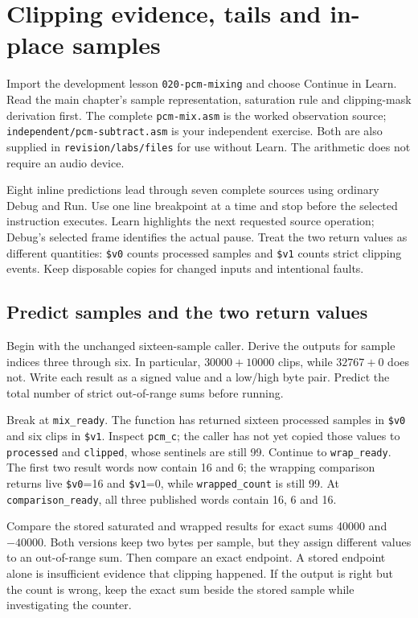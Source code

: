 \chapter{Clipping evidence, tails and in-place samples}
\label{revision-lab:pcm}

Import the development lesson \texttt{020-pcm-mixing} and choose Continue in
Learn. Read the main chapter's sample representation, saturation rule and
clipping-mask derivation first. The complete \texttt{pcm-mix.asm} is the worked
observation source; \texttt{independent/pcm-subtract.asm} is your independent
exercise. Both are also supplied in \texttt{revision/labs/files} for use without
Learn. The arithmetic does not require an audio device.

Eight inline predictions lead through seven complete sources using ordinary
Debug and Run. Use one line breakpoint at a time and stop before the selected
instruction executes. Learn highlights the next requested source operation;
Debug's selected frame identifies the actual pause. Treat the two return values
as different quantities: \texttt{\$v0} counts processed samples and
\texttt{\$v1} counts strict clipping events. Keep disposable copies for changed
inputs and intentional faults.

\section{Predict samples and the two return values}

Begin with the unchanged sixteen-sample caller. Derive the outputs for sample
indices three through six. In particular, $30000+10000$ clips, while
$32767+0$ does not. Write each result as a signed value and a low/high byte pair.
Predict the total number of strict out-of-range sums before running.

Break at \texttt{mix\_ready}. The function has returned sixteen processed samples
in \texttt{\$v0} and six clips in \texttt{\$v1}. Inspect \texttt{pcm\_c}; the
caller has not yet copied those values to \texttt{processed} and
\texttt{clipped}, whose sentinels are still 99. Continue to
\texttt{wrap\_ready}. The first two result words now contain 16 and 6; the
wrapping comparison returns live \texttt{\$v0}=16 and \texttt{\$v1}=0, while
\texttt{wrapped\_count} is still 99. At \texttt{comparison\_ready}, all three
published words contain 16, 6 and 16.

Compare the stored saturated and wrapped results for exact sums 40000 and
$-40000$. Both versions keep two bytes per sample, but they assign different
values to an out-of-range sum. Then compare an exact endpoint. A stored endpoint
alone is insufficient evidence that clipping happened. If the output is right
but the count is wrong, keep the exact sum beside the stored sample while
investigating the counter.

